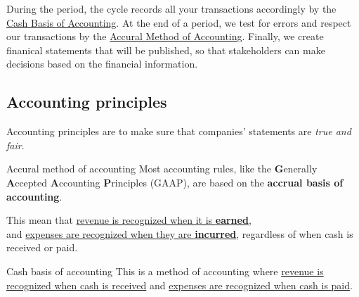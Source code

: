 During the period, the cycle records all your transactions accordingly by the \hyperref[thm:cash_basis]{Cash Basis of Accounting}. At the end of a period, we test for errors and respect our transactions by the \hyperref[thm:accrual_basis]{Accural Method of Accounting}. Finally, we create finanical statements that will be published, so that stakeholders can make decisions based on the financial information.

\subsection{Accounting principles}
Accounting principles are to make sure that companies' statements are \textit{true and fair}.
\begin{theorem}
    {Accural method of accounting}
    Most accounting rules, like the \textbf{G}enerally \textbf{A}ccepted \textbf{A}ccounting \textbf{P}rinciples (GAAP), are based on the \textbf{accrual basis of accounting}.
    \vspace{0.5em}

    This mean that \underline{revenue is recognized when it is \textbf{earned}},\\and \underline{expenses are recognized when they are \textbf{incurred}}, regardless of when cash is received or paid.
    \label{thm:accrual_basis}
\end{theorem}
\begin{knBox}
    {Cash basis of accounting}
    This is a method of accounting where \underline{revenue is recognized when cash is received} and \underline{expenses are recognized when cash is paid}.
    \label{thm:cash_basis}
\end{knBox}

